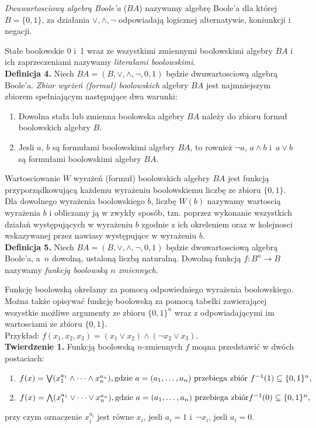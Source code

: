 \documentclass[a4paper,11pt,twoside]{article}
\theoremstyle{definition}
\begin{document}
{\em Dwuwartosciową algebrą Boole'a} ($\mathit{BA}$) nazywamy algebrę Boole'a dla której $B=\{0,1\}$, za działania $\vee,\wedge,\neg$ odpowiadają logicznej alternatywie, koniunkcji i negacji.

Stałe boolowskie 0 i~1 wraz ze wszystkimi zmiennymi boolowskimi algebry $\mathit{BA}$ i ich zaprzeczeniami nazywamy {\em literałami boolowskimi}. \\
\newline
\textbf{Definicja 4.} Niech $\mathit{BA} = (B,\vee,\wedge,\neg,0,1)$ będzie dwuwartosciową algebrą Boole'a. {\em Zbior wyrżeń (formuł) boolowskich}  algebry $\mathit{BA}$ jest najmniejszym zbiorem spełniającym następujące dwa warunki:
\begin{enumerate}
\item Dowolna stała lub zmienna boolowska algebry $\mathit{BA}$ należy do zbioru formuł boolowskich algebry $\mathit{B}.$
\item Jesli $a$, $b$ są formułami boolowskimi algebry $\mathit{BA}$, to rownież $\neg a$, $a \wedge b$ i~$a \vee b$ są formułami boolowskimi algebry $\mathit{BA}$.
\end{enumerate}
Wartosciowanie $W$ wyrażeń (formuł) boolowskich algebry $\mathit{BA}$ jest funkcją przyporządkowującą każdemu wyrażeniu boolowskiemu liczbę ze zbioru $\{0,1\}$. Dla dowolnego wyrażenia boolowskiego $b$, liczbę $W(b)$ nazywamy wartoscią wyrażenia $b$ i obliczamy ją w zwykły sposób, tzn. poprzez wykonanie wszystkich działań występujących w  wyrażeniu $b$ zgodnie z ich okreleniem oraz w kolejnosci wskazywanej przez nawiasy występujące w wyrażeniu $b$.\\
\newline
\textbf{Definicja 5.} Niech $\mathit{BA} = (B,\vee,\wedge,\neg,0,1)$ będzie dwuwartosciową algebrą Boole'a, a~$n$ dowolną, ustaloną liczbą naturalną. Dowolną funkcją $f\colon B^n \to B$ nazywamy {\em funkcją boolowską $n$ zmiennych}.

Funkcję boolowską okrelamy za pomocą odpowiedniego wyrażenia boolowskiego. Można także opisywać funkcję boolowską za pomocą tabelki zawierającej wszystkie możliwe argumenty ze zbioru $\{0,1\}^n$ wraz z odpowiadającymi im wartosciami ze zbioru $\{0,1\}$.\\

Przykład: $f(x_1,x_2,x_3) = (x_1 \vee x_2) \wedge (\neg x_2 \vee x_3)$.\\
\newline
\textbf{Twierdzenie 1.} Funkcją boolowską $n$-zmiennych $f$ moąna przedstawić w dwóch postaciach:
\begin{enumerate}
\item $f(x) = \bigvee(x_1^{a_1} \wedge\dots\wedge x_n^{a_n}),\textnormal{gdzie }a = (a_1,\dots,a_n) \textnormal{ przebiega zbiór } f^{-1}(1) \subseteq \{0,1\}^n,$
\item $f(x) = \bigwedge(x_1^{a_1} \vee\dots\vee x_n^{a_n}),\textnormal{gdzie }a = (a_1,\dots,a_n) \textnormal{ przebiega zbiór} f^{-1}(0) \subseteq \{0,1\}^n,$
\end{enumerate}
przy czym oznaczenie $x_i^{a_i}$ jest równe $x_i$, jesli $a_i=1$ i~$\neg x_i$, jesli $a_i=0$.
\end{document}

